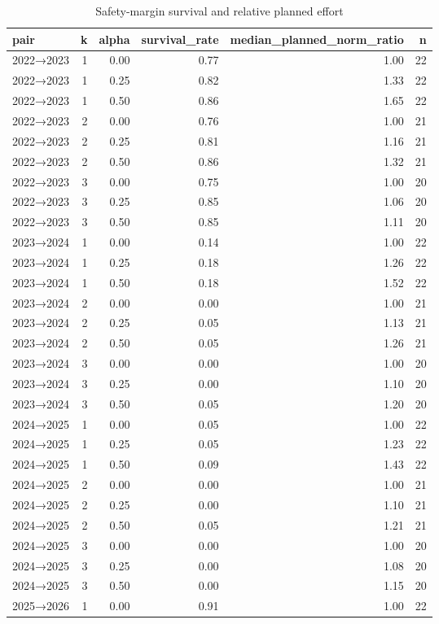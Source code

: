 \begin{table}[htbp]
\centering
\caption{Safety-margin survival and relative planned effort}
\label{tab:e2-margin}
\begin{tabular}{lrrrrr}
\toprule
pair & k & alpha & survival\_rate & median\_planned\_norm\_ratio & n \\
\midrule
2022→2023 & 1 & 0.00 & 0.77 & 1.00 & 22 \\
2022→2023 & 1 & 0.25 & 0.82 & 1.33 & 22 \\
2022→2023 & 1 & 0.50 & 0.86 & 1.65 & 22 \\
2022→2023 & 2 & 0.00 & 0.76 & 1.00 & 21 \\
2022→2023 & 2 & 0.25 & 0.81 & 1.16 & 21 \\
2022→2023 & 2 & 0.50 & 0.86 & 1.32 & 21 \\
2022→2023 & 3 & 0.00 & 0.75 & 1.00 & 20 \\
2022→2023 & 3 & 0.25 & 0.85 & 1.06 & 20 \\
2022→2023 & 3 & 0.50 & 0.85 & 1.11 & 20 \\
2023→2024 & 1 & 0.00 & 0.14 & 1.00 & 22 \\
2023→2024 & 1 & 0.25 & 0.18 & 1.26 & 22 \\
2023→2024 & 1 & 0.50 & 0.18 & 1.52 & 22 \\
2023→2024 & 2 & 0.00 & 0.00 & 1.00 & 21 \\
2023→2024 & 2 & 0.25 & 0.05 & 1.13 & 21 \\
2023→2024 & 2 & 0.50 & 0.05 & 1.26 & 21 \\
2023→2024 & 3 & 0.00 & 0.00 & 1.00 & 20 \\
2023→2024 & 3 & 0.25 & 0.00 & 1.10 & 20 \\
2023→2024 & 3 & 0.50 & 0.05 & 1.20 & 20 \\
2024→2025 & 1 & 0.00 & 0.05 & 1.00 & 22 \\
2024→2025 & 1 & 0.25 & 0.05 & 1.23 & 22 \\
2024→2025 & 1 & 0.50 & 0.09 & 1.43 & 22 \\
2024→2025 & 2 & 0.00 & 0.00 & 1.00 & 21 \\
2024→2025 & 2 & 0.25 & 0.00 & 1.10 & 21 \\
2024→2025 & 2 & 0.50 & 0.05 & 1.21 & 21 \\
2024→2025 & 3 & 0.00 & 0.00 & 1.00 & 20 \\
2024→2025 & 3 & 0.25 & 0.00 & 1.08 & 20 \\
2024→2025 & 3 & 0.50 & 0.00 & 1.15 & 20 \\
2025→2026 & 1 & 0.00 & 0.91 & 1.00 & 22 \\

\end{tabular}
\end{table}
